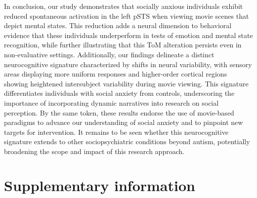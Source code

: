 In conclusion, our study demonstrates that socially anxious individuals exhibit reduced spontaneous activation in the left pSTS when viewing movie scenes that depict mental states. This reduction adds a neural dimension to behavioral evidence that these individuals underperform in tests of emotion and mental state recognition, while further illustrating that this ToM alteration persists even in non-evaluative settings. Additionally, our findings delineate a distinct neurocognitive signature characterized by shifts in neural variability, with sensory areas displaying more uniform responses and higher-order cortical regions showing heightened intersubject variability during movie viewing. This signature differentiates individuals with social anxiety from controls, underscoring the importance of incorporating dynamic narratives into research on social perception. By the same token, these results endorse the use of movie-based paradigms to advance our understanding of social anxiety and to pinpoint new targets for intervention. It remains to be seen whether this neurocognitive signature extends to other sociopsychiatric conditions beyond autism, potentially broadening the scope and impact of this research approach.

\section*{Supplementary information}


